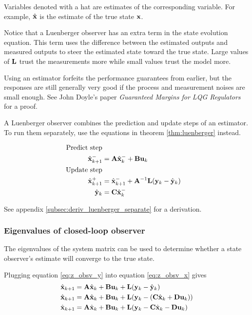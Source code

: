 Variables denoted with a hat are estimates of the corresponding variable. For
example, $\hat{\mathbf{x}}$ is the estimate of the true \gls{state} $\mathbf{x}$.

Notice that a Luenberger \gls{observer} has an extra term in the \gls{state}
evolution equation. This term uses the difference between the estimated
\glspl{output} and measured \glspl{output} to steer the estimated \gls{state}
toward the true \gls{state}. Large values of $\mathbf{L}$ trust the measurements
more while small values trust the \gls{model} more.
\begin{remark}
  Using an estimator forfeits the performance guarantees from earlier, but the
  responses are still generally very good if the process and measurement noises
  are small enough. See John Doyle's paper \textit{Guaranteed Margins for LQG
  Regulators} for a proof.
\end{remark}

A Luenberger \gls{observer} combines the prediction and update steps of an
estimator. To run them separately, use the equations in theorem
\ref{thm:luenberger} instead.
\begin{theorem}
  \label{thm:luenberger}
  \begin{align}
    \text{Predict step} \nonumber \\
    \hat{\mathbf{x}}_{k+1}^- &= \mathbf{A}\hat{\mathbf{x}}_k^- + \mathbf{B}\mathbf{u}_k \\
    \text{Update step} \nonumber \\
    \hat{\mathbf{x}}_{k+1}^+ &= \hat{\mathbf{x}}_{k+1}^- + \mathbf{A}^{-1}\mathbf{L}
      (\mathbf{y}_k - \hat{\mathbf{y}}_k) \\
    \hat{\mathbf{y}}_k &= \mathbf{C} \hat{\mathbf{x}}_k^-
  \end{align}
\end{theorem}

See appendix \ref{subsec:deriv_luenberger_separate} for a derivation.

\subsubsection{Eigenvalues of closed-loop observer}

The eigenvalues of the system matrix can be used to determine whether a
\gls{state} \gls{observer}'s estimate will converge to the true \gls{state}.

Plugging equation \eqref{eq:z_obsv_y} into equation \eqref{eq:z_obsv_x} gives
\begin{align*}
  \hat{\mathbf{x}}_{k+1} &= \mathbf{A}\hat{\mathbf{x}}_k + \mathbf{B}\mathbf{u}_k +
    \mathbf{L} (\mathbf{y}_k - \hat{\mathbf{y}}_k) \\
  \hat{\mathbf{x}}_{k+1} &= \mathbf{A}\hat{\mathbf{x}}_k + \mathbf{B}\mathbf{u}_k +
    \mathbf{L} (\mathbf{y}_k - (\mathbf{C}\hat{\mathbf{x}}_k + \mathbf{D}\mathbf{u}_k)) \\
  \hat{\mathbf{x}}_{k+1} &= \mathbf{A}\hat{\mathbf{x}}_k + \mathbf{B}\mathbf{u}_k +
    \mathbf{L} (\mathbf{y}_k - \mathbf{C}\hat{\mathbf{x}}_k - \mathbf{D}\mathbf{u}_k)
\end{align*}

